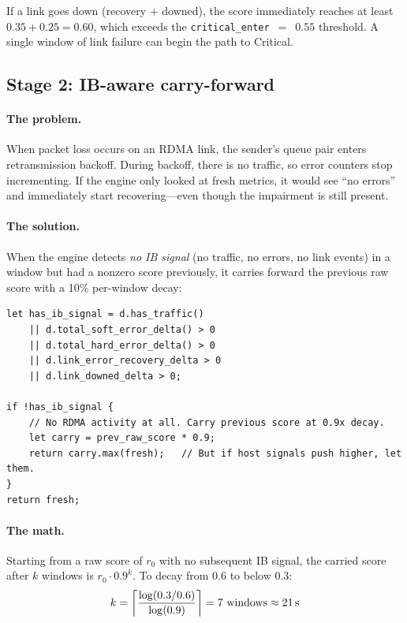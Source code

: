 \documentclass[11pt]{article}
\begin{document}
\begin{keyinsight}
  If a link goes down (recovery $+$ downed), the score immediately reaches at
  least $0.35 + 0.25 = 0.60$, which exceeds the
  \texttt{critical\_enter}~$=$~$0.55$ threshold. A single window of link
  failure can begin the path to Critical.
\end{keyinsight}


\subsection{Stage 2: IB-aware carry-forward}
\label{sec:carry-forward}

\paragraph{The problem.}
When packet loss occurs on an RDMA link, the sender's queue pair enters
retransmission backoff. During backoff, there is no traffic, so error counters
stop incrementing. If the engine only looked at fresh metrics, it would see
``no errors'' and immediately start recovering---even though the impairment is
still present.

\paragraph{The solution.}
When the engine detects \emph{no IB signal} (no traffic, no errors, no link
events) in a window but had a nonzero score previously, it carries forward
the previous raw score with a 10\% per-window decay:

\begin{lstlisting}[caption={Carry-forward logic (detection/mod.rs)}]
let has_ib_signal = d.has_traffic()
    || d.total_soft_error_delta() > 0
    || d.total_hard_error_delta() > 0
    || d.link_error_recovery_delta > 0
    || d.link_downed_delta > 0;

if !has_ib_signal {
    // No RDMA activity at all. Carry previous score at 0.9x decay.
    let carry = prev_raw_score * 0.9;
    return carry.max(fresh);   // But if host signals push higher, let them.
}
return fresh;
\end{lstlisting}

\paragraph{The math.}
Starting from a raw score of $r_0$ with no subsequent IB signal, the carried
score after $k$ windows is $r_0 \cdot 0.9^k$. To decay from 0.6 to below 0.3:
\[
  k = \left\lceil \frac{\log(0.3/0.6)}{\log(0.9)} \right\rceil = 7 \text{ windows} \approx 21\text{\,s}
\]
\end{document}
